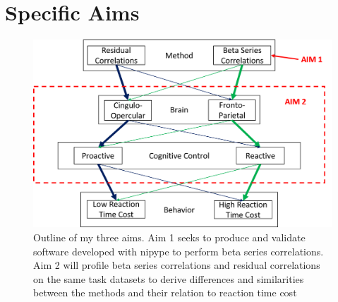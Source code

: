 \documentclass[phd,appendix,figures]{uithesis}
\begin{document}
\section{Specific Aims}
\begin{figure}[H]%
	\centering
	\includegraphics[width=1\linewidth]{overall_thesis_pic}
	\caption{Outline of my three aims. Aim 1 seeks to produce and validate software developed with nipype to perform beta series correlations.
	Aim 2 will profile beta series correlations and residual correlations on the same task datasets to derive differences and similarities between the methods and their relation to reaction time cost}
	\label{fig:all_aims}
\end{figure}
\end{document}
